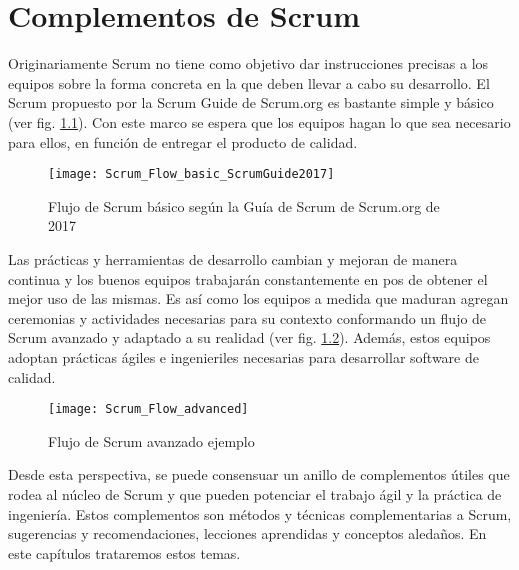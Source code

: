 \chapter{Complementos de Scrum}

Originariamente Scrum no tiene como objetivo dar instrucciones precisas a los equipos sobre la forma concreta en la que deben llevar a cabo su desarrollo. El Scrum propuesto por la Scrum Guide de Scrum.org es bastante simple y básico (ver fig. \ref{fig:Scrum_Flow_basic_ScrumGuide2017}). Con este marco se espera que los equipos hagan lo que sea necesario para ellos, en función de entregar el producto de calidad. 

\begin{figure}[h]
  \centering
  \texttt{[image: Scrum\_Flow\_basic\_ScrumGuide2017]}
  \caption{Flujo de Scrum básico según la Guía de Scrum de Scrum.org de 2017}
  \centering
  \label{fig:Scrum_Flow_basic_ScrumGuide2017} %
\end{figure}
\newpage

Las prácticas y herramientas de desarrollo cambian y mejoran de manera continua y los buenos equipos trabajarán constantemente en pos de obtener el mejor uso de las mismas. Es así como los equipos a medida que maduran agregan ceremonias y actividades necesarias para su contexto conformando un flujo de Scrum avanzado y adaptado a su realidad (ver fig. \ref{fig:Scrum_Flow_advanced}). Además, estos equipos adoptan prácticas ágiles e ingenieriles necesarias para desarrollar software de calidad.

\begin{figure}[h]
  \centering
  \texttt{[image: Scrum\_Flow\_advanced]}
  \caption{Flujo de Scrum avanzado ejemplo}
  \centering
  \label{fig:Scrum_Flow_advanced} %
\end{figure}

Desde esta perspectiva, se puede consensuar un anillo de complementos útiles que rodea al núcleo de Scrum y que pueden potenciar el trabajo ágil y la práctica de ingeniería. Estos complementos son métodos y técnicas complementarias a Scrum, sugerencias y recomendaciones, lecciones aprendidas y conceptos aledaños. En este capítulos trataremos estos temas.



